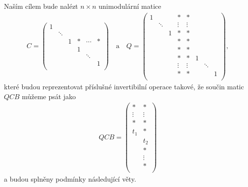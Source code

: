 Naším cílem bude nalézt $ n \times n $ unimodulární matice
\begin{align} \label{Q_C}
C =
    \begin{pmatrix}
        1 &        &   &      &        &     \\
          & \ddots &   &      &        &     \\
          &        & 1 & \ast & \cdots & \ast \\
          &        &   & 1    &        &     \\
          &        &   &      & \ddots &     \\
          &        &   &      &        & 1   \\
    \end{pmatrix}
\quad \text{a} \quad
Q =
    \begin{pmatrix}
        1 &        &   & \ast   & \ast   &   &        &   \\
          & \ddots &   & \vdots & \vdots &   &        &   \\
          &        & 1 & \ast   & \ast   &   &        &   \\
          &        &   & \ast   & \ast   &   &        &   \\
          &        &   & \ast   & \ast   &   &        &   \\
          &        &   & \ast   & \ast   & 1 &        &   \\
          &        &   & \vdots & \vdots &   & \ddots &   \\
          &        &   & \ast   & \ast   &   &        & 1 \\
    \end{pmatrix}
,
\end{align}
které budou reprezentovat příslušné invertibilní operace takové, že součin matic
$ QCB $ můžeme psát jako
\begin{align} \label{QCB}
QCB =
    \begin{pmatrix}
        \ast   & \ast   \\
        \vdots & \vdots \\
        \ast   & \ast   \\
        t_1    & \ast   \\
               & t_2    \\
               & \ast   \\
               & \vdots \\
               & \ast   \\
    \end{pmatrix}
\end{align}
a budou splněny podmínky následující věty.

